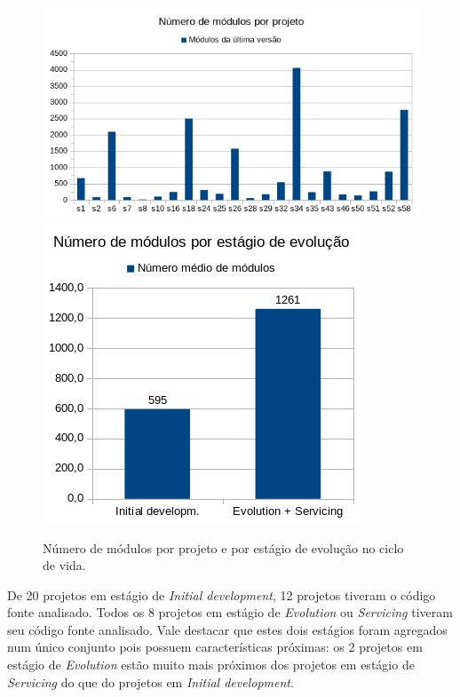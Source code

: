 \begin{figure}[h]
  \center
  \includegraphics[scale=0.6]{imagens/modules-total.png}
  \includegraphics[scale=0.6]{imagens/modules-average.png}
  \caption{Número de módulos por projeto e por estágio de evolução no ciclo de vida.}
  \label{modules-average}
\end{figure}


De 20 projetos em estágio de {\it Initial development}, 
12 projetos tiveram o código fonte analisado. 
Todos os 8 projetos em estágio de {\it Evolution} ou {\it Servicing}
tiveram seu código fonte analisado.
Vale destacar que estes dois estágios foram agregados num único conjunto 
pois possuem características próximas: 
os 2 projetos em estágio de {\it Evolution} estão
muito mais próximos dos projetos em estágio de {\it Servicing} do que 
do projetos em {\it Initial development}. 

